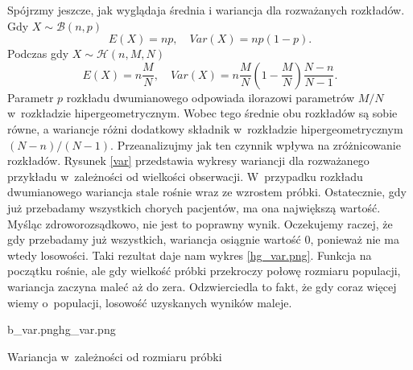 Spójrzmy jeszcze, jak wyglądaja średnia i wariancja dla rozważanych rozkładów. \newline
Gdy $X\sim\mathcal{B}(n,p)$
\begin{equation}
E(X)=np,\quad Var(X)=np(1-p).
\end{equation}
Podczas gdy $X\sim\mathcal{H}(n,M,N)$
\begin{equation}
E(X)=n\frac{M}{N},\quad Var(X)=n\frac{M}{N}\left(1-\frac{M}{N}\right)\frac{N-n}{N-1}.
\end{equation}
Parametr $p$ rozkładu dwumianowego odpowiada ilorazowi parametrów $M/N$ w~rozkładzie hipergeometrycznym. Wobec tego średnie obu rozkładów są sobie równe, a wariancje różni dodatkowy składnik w~rozkładzie hipergeometrycznym $(N-n)/(N-1)$. Przeanalizujmy jak ten czynnik wpływa na zróżnicowanie rozkładów. Rysunek \ref{var} przedstawia wykresy wariancji dla rozważanego przykładu w~zależności od wielkości obserwacji. W~przypadku rozkładu dwumianowego wariancja stale rośnie wraz ze wzrostem próbki. Ostatecznie, gdy już przebadamy wszystkich chorych pacjentów, ma ona największą wartość. Myśląc zdroworozsądkowo, nie jest to poprawny wynik. Oczekujemy raczej, że gdy przebadamy już wszystkich, wariancja osiągnie wartość $0$, ponieważ nie ma wtedy losowości. Taki rezultat daje nam wykres \ref{hg_var.png}. Funkcja na początku rośnie, ale gdy wielkość próbki przekroczy połowę rozmiaru populacji, wariancja zaczyna maleć aż do zera. Odzwierciedla to fakt, że gdy coraz więcej wiemy o~populacji, losowość uzyskanych wyników maleje.

\begin{diagrams}{b_var.png}{hg_var.png}
	\caption{Wariancja w~zależności od rozmiaru próbki}
	\label{var}
\end{diagrams}